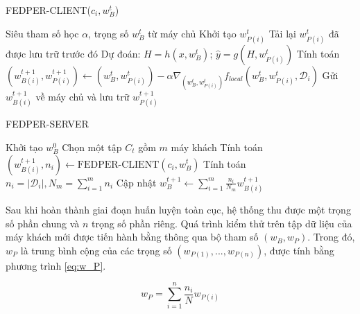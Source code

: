 \begin{algorithm}
    \caption{FEDPER-CLIENT($c_i, w_B^t$) \cite{arivazhagan2019federated}} \label{alg:fedper_client}
    \begin{algorithmic}[1]
        \Require Siêu tham số học $\alpha$, trọng số $w_B^t$ từ máy chủ
            \State Khởi tạo $w_{P(i)}^t$
        \Else
            \State Tải lại $w_{P(i)}^t$ đã được lưu trữ trước đó
        \EndIf
        \State Dự đoán: $H = h(x, w_{B}^t)$; $\hat{y} = g(H, w_{P(i)}^t)$
        \State Tính toán $(w_{B(i)}^{t+1}, w_{P(i)}^{t+1}) \gets (w_{B}^t, w_{P(i)}^t) - \alpha\nabla_{(w_{B}^t, w_{P(i)}^t)} f_{local}(w_{B}^t, w_{P(i)}^t, \mathcal{D}_i)$
        \State Gửi $w_{B(i)}^{t+1}$ về máy chủ và lưu trữ $w_{P(i)}^{t+1}$
    \end{algorithmic}
\end{algorithm}

\begin{algorithm}
    \caption{FEDPER-SERVER \cite{arivazhagan2019federated}} \label{alg:fedper_server}
    \begin{algorithmic}[1]
        \State Khởi tạo $w_{B}^{0}$
            \State Chọn một tập $C_t$ gồm $m$ máy khách
                \State Tính toán $(w_{B(i)}^{t+1}, n_i) \gets \text{FEDPER-CLIENT}(c_i, w_B^t)$
            \EndFor
            \State Tính toán $n_i = \left| \mathcal{D}_i \right|, N_m = \sum_{i=1}^m n_i$
            \State Cập nhật $w_B^{t+1} \gets \sum_{i=1}^m \frac{n_i}{N_m} w_{B(i)}^{t+1}$
        \EndFor
    \end{algorithmic}
\end{algorithm}

Sau khi hoàn thành giai đoạn huấn luyện toàn cục, hệ thống thu được một trọng số phần chung và $n$ trọng số phần riêng. Quá trình kiểm thử trên tập dữ liệu của máy khách mới được tiến hành bằng thông qua bộ tham số $(w_B, w_P)$. Trong đó, $w_P$ là trung bình cộng của các trọng số $(w_{P(1)},...,w_{P(n)})$, được tính bằng phương trình \ref{eq:w_P}.

\begin{dmath}
    \label{eq:w_P}
    w_P = \sum_{i=1}^n \frac{n_i}{N}w_{P(i)}
\end{dmath}


